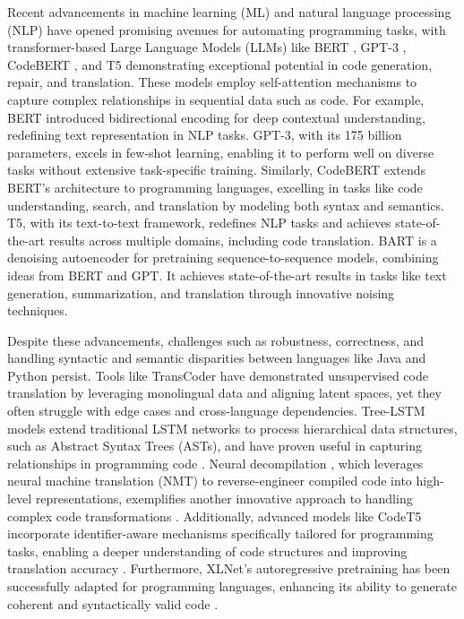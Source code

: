 \documentclass{dhbenelux}
\begin{document}
Recent advancements in machine learning (ML) and natural language processing (NLP) have opened promising avenues for automating programming tasks, with transformer-based Large Language Models (LLMs) like BERT \cite{bert2018}, GPT-3 \cite{gpt32020}, CodeBERT \cite{codebert2020}, and T5 \cite{t52019} demonstrating exceptional potential in code generation, repair, and translation. These models employ self-attention mechanisms to capture complex relationships in sequential data such as code. For example, BERT introduced bidirectional encoding for deep contextual understanding, redefining text representation in NLP tasks. GPT-3, with its 175 billion parameters, excels in few-shot learning, enabling it to perform well on diverse tasks without extensive task-specific training. Similarly, CodeBERT extends BERT’s architecture to programming languages, excelling in tasks like code understanding, search, and translation by modeling both syntax and semantics. T5, with its text-to-text framework, redefines NLP tasks and achieves state-of-the-art results across multiple domains, including code translation. BART \cite{bart2019} is a denoising autoencoder for pretraining sequence-to-sequence models, combining ideas from BERT and GPT. It achieves state-of-the-art results in tasks like text generation, summarization, and translation through innovative noising techniques.

Despite these advancements, challenges such as robustness, correctness, and handling syntactic and semantic disparities between languages like Java and Python persist. Tools like TransCoder \cite{lachaux2020} have demonstrated unsupervised code translation by leveraging monolingual data and aligning latent spaces, yet they often struggle with edge cases and cross-language dependencies. Tree-LSTM models extend traditional LSTM networks to process hierarchical data structures, such as Abstract Syntax Trees (ASTs), and have proven useful in capturing relationships in programming code \cite{tai2015}. Neural decompilation \cite{katz2019}, which leverages neural machine translation (NMT) \cite{nmt2019} to reverse-engineer compiled code into high-level representations, exemplifies another innovative approach to handling complex code transformations \cite{katz2019}. Additionally, advanced models like CodeT5  incorporate identifier-aware mechanisms specifically tailored for programming tasks, enabling a deeper understanding of code structures and improving translation accuracy \cite{codet52021}. Furthermore, XLNet's autoregressive pretraining has been successfully adapted for programming languages, enhancing its ability to generate coherent and syntactically valid code \cite{xlnet2019}.
\end{document}
